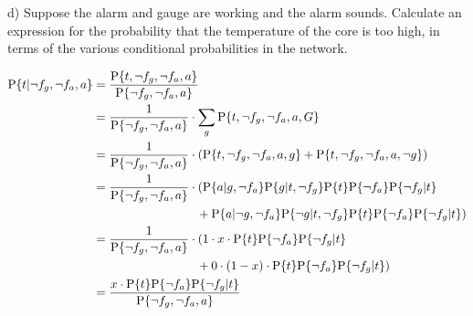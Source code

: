 \documentclass[a4paper,footsepline]{scrartcl}
\begin{document}
d) Suppose the alarm and gauge are working and the alarm sounds. Calculate
  an expression for the probability that the temperature of the core is too
  high, in terms of the various conditional probabilities in the network.

	\begin{align*} 
	\prob{t|\neg f_g, \neg f_a, a} &= \frac{\prob{t,\neg f_g, \neg f_a, a}}{\prob{\neg f_g, \neg f_a, a}} \\
	&= \frac{1}{\prob{\neg f_g, \neg f_a, a}} \cdot \sum_g \prob{t,\neg f_g, \neg f_a, a, G} \\
	&= \frac{1}{\prob{\neg f_g, \neg f_a, a}} \cdot \left( \prob{t,\neg f_g, \neg f_a, a, g} + \prob{t,\neg f_g, \neg f_a, a, \neg g} \right) \\
	&= \frac{1}{\prob{\neg f_g, \neg f_a, a}} \cdot ( \prob{a | g, \neg f_a} \prob{g|t, \neg f_g} \prob{t} \prob{\neg f_a} \prob{\neg f_g | t}  \\
                                             & \hspace{3cm} + \prob{a | \neg g, \neg f_a} \prob{\neg g|t, \neg f_g} \prob{t} \prob{\neg f_a} \prob{\neg f_g | t} ) \\
	&= \frac{1}{\prob{\neg f_g, \neg f_a, a}} \cdot ( 1 \cdot x \cdot \prob{t} \prob{\neg f_a} \prob{\neg f_g | t}  \\
                                             & \hspace{3cm} + 0 \cdot (1-x) \cdot \prob{t} \prob{\neg f_a} \prob{\neg f_g | t} ) \\
	&= \frac{x \cdot \prob{t} \prob{\neg f_a} \prob{\neg f_g | t}}{\prob{\neg f_g, \neg f_a, a}} \\
	\end{align*}
	
\end{document}
